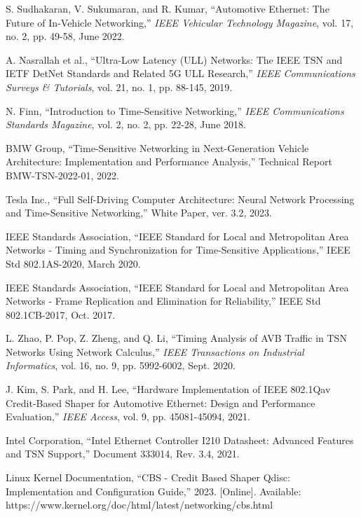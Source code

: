 \documentclass[10pt, journal, compsoc]{IEEEtran}
\begin{document}
\begin{thebibliography}{99}

S. Sudhakaran, V. Sukumaran, and R. Kumar, ``Automotive Ethernet: The Future of In-Vehicle Networking,'' \textit{IEEE Vehicular Technology Magazine}, vol. 17, no. 2, pp. 49-58, June 2022.

A. Nasrallah et al., ``Ultra-Low Latency (ULL) Networks: The IEEE TSN and IETF DetNet Standards and Related 5G ULL Research,'' \textit{IEEE Communications Surveys \& Tutorials}, vol. 21, no. 1, pp. 88-145, 2019.

N. Finn, ``Introduction to Time-Sensitive Networking,'' \textit{IEEE Communications Standards Magazine}, vol. 2, no. 2, pp. 22-28, June 2018.

BMW Group, ``Time-Sensitive Networking in Next-Generation Vehicle Architecture: Implementation and Performance Analysis,'' Technical Report BMW-TSN-2022-01, 2022.

Tesla Inc., ``Full Self-Driving Computer Architecture: Neural Network Processing and Time-Sensitive Networking,'' White Paper, ver. 3.2, 2023.

IEEE Standards Association, ``IEEE Standard for Local and Metropolitan Area Networks - Timing and Synchronization for Time-Sensitive Applications,'' IEEE Std 802.1AS-2020, March 2020.

IEEE Standards Association, ``IEEE Standard for Local and Metropolitan Area Networks - Frame Replication and Elimination for Reliability,'' IEEE Std 802.1CB-2017, Oct. 2017.

L. Zhao, P. Pop, Z. Zheng, and Q. Li, ``Timing Analysis of AVB Traffic in TSN Networks Using Network Calculus,'' \textit{IEEE Transactions on Industrial Informatics}, vol. 16, no. 9, pp. 5992-6002, Sept. 2020.

J. Kim, S. Park, and H. Lee, ``Hardware Implementation of IEEE 802.1Qav Credit-Based Shaper for Automotive Ethernet: Design and Performance Evaluation,'' \textit{IEEE Access}, vol. 9, pp. 45081-45094, 2021.

Intel Corporation, ``Intel Ethernet Controller I210 Datasheet: Advanced Features and TSN Support,'' Document 333014, Rev. 3.4, 2021.

Linux Kernel Documentation, ``CBS - Credit Based Shaper Qdisc: Implementation and Configuration Guide,'' 2023. [Online]. Available: https://www.kernel.org/doc/html/latest/networking/cbs.html


\end{thebibliography}
\end{document}
